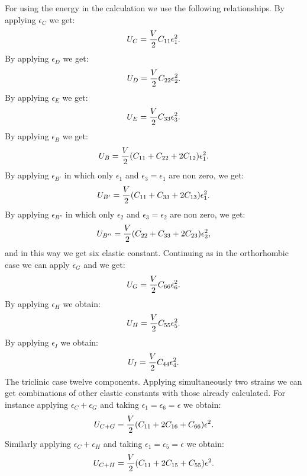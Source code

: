 \documentclass[12pt,a4paper]{article}
\begin{document}
For using the energy in the calculation we use the following
relationships. By applying $\epsilon_C$ we get:
\begin{equation}
U_C= {V \over 2} C_{11} \epsilon_1^2.
\end{equation}
By applying $\epsilon_D$ we get:
\begin{equation}
U_D= {V \over 2} C_{22} \epsilon_2^2.
\end{equation}
By applying $\epsilon_E$ we get:
\begin{equation}
U_E= {V \over 2} C_{33} \epsilon_3^2.
\end{equation}
By applying $\epsilon_B$ we get:
\begin{equation}
U_B= {V \over 2} (C_{11} + C_{22} + 2 C_{12}) \epsilon_1^2.
\end{equation}
By applying $\epsilon_{B'}$ in which only $\epsilon_1$ and
$\epsilon_3=\epsilon_1$ are non zero, we get:
\begin{equation}
U_{B'}= {V \over 2} (C_{11} + C_{33} + 2 C_{13}) \epsilon_1^2.
\end{equation}
By applying $\epsilon_{B''}$ in which only $\epsilon_2$ and
$\epsilon_3=\epsilon_2$ are non zero, we get:
\begin{equation}
U_{B''}= {V \over 2} (C_{22} + C_{33} + 2 C_{23}) \epsilon_2^2,
\end{equation}
and in this way we get six elastic constant. Continuing as in the
orthorhombic case we can
apply $\epsilon_G$ and we get:
\begin{equation}
U_G= {V \over 2} C_{66} \epsilon_6^2.
\end{equation}
By applying $\epsilon_H$ we obtain:
\begin{equation}
U_H= {V \over 2} C_{55} \epsilon_5^2.
\end{equation}
By applying $\epsilon_I$ we obtain:
\begin{equation}
U_I= {V \over 2} C_{44} \epsilon_4^2.
\end{equation}
The triclinic case twelve components. Applying simultaneously two strains
we can get combinations of other elastic constants with those already
calculated. For instance applying $\epsilon_C + \epsilon_G$ and taking
$\epsilon_1=\epsilon_6=\epsilon$ we obtain:
\begin{equation}
U_{C+G}= {V \over 2} (C_{11}+2 C_{16} + C_{66}) \epsilon^2.
\end{equation}
Similarly applying $\epsilon_C + \epsilon_H$ and taking $\epsilon_1=
\epsilon_5=\epsilon$ we obtain:
\begin{equation}
U_{C+H}= {V \over 2} (C_{11}+2 C_{15} + C_{55}) \epsilon^2.
\end{equation}
\end{document}
